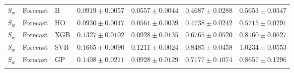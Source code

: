 \begin{table}[t]
\begin{tabular}{@{}cllcccc@{}}
\addlinespace[1pt]
$S_w$ & Forecast & H & $0.0919\pm0.0057$ & $0.0557\pm0.0044$ & $0.4687\pm0.0288$ & $0.5653\pm0.0347$ \\
$S_w$ & Forecast & HO & $0.0930\pm0.0047$ & $0.0561\pm0.0039$ & $0.4738\pm0.0242$ & $0.5715\pm0.0291$ \\
$S_w$ & Forecast & XGB & $0.1327\pm0.0102$ & $0.0928\pm0.0135$ & $0.6765\pm0.0520$ & $0.8160\pm0.0627$ \\
$S_w$ & Forecast & SVR & $0.1665\pm0.0090$ & $0.1211\pm0.0024$ & $0.8485\pm0.0458$ & $1.0234\pm0.0553$ \\
$S_w$ & Forecast & GP & $0.1408\pm0.0211$ & $0.0928\pm0.0129$ & $0.7177\pm0.1074$ & $0.8657\pm0.1296$ \\
\addlinespace[1pt]
\bottomrule
\end{tabular}
\end{table}
